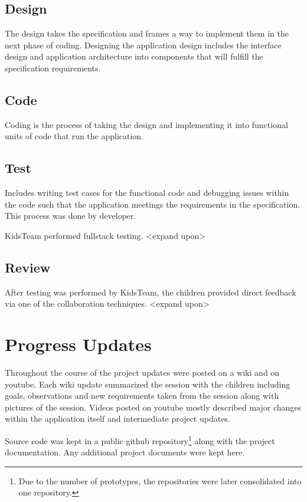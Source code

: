 \subsection{Design}\label{sec:designphase}
 The design takes the specification and frames a way to implement them in the next phase of coding. Designing the application design includes the interface design and application architecture into components that will fulfill the specification requirements.  

\subsection{Code}\label{sec:codephase}
Coding is the process of taking the design and implementing it into functional units of code that run the application. 

\subsection{Test}\label{sec:testphase}

Includes writing test cases for the functional code and debugging issues within the code such that the application meetings the requirements in the specification. This process was done by developer.

KidsTeam performed fullstack testing. <expand upon>

\subsection{Review}\label{sec:reviewphase}

After testing was performed by KidsTeam, the children provided direct feedback via one of the collaboration techniques. <expand upon>

\section{Progress Updates}
Throughout the course of the project updates were posted on a wiki and on youtube. Each wiki update summarized the session with the children including goals, observations and new requirements taken from the session along with pictures of the session. Videos posted on youtube mostly described major changes within the application itself and intermediate project updates.

Source code was kept in a public github repository\footnote{Due to the number of prototypes, the repositories were later consolidated into one repository.} along with the project documentation. Any additional project documents were kept here. 

